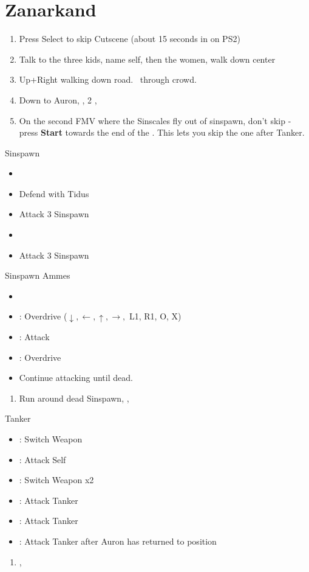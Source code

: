 \chapter{Zanarkand}

\begin{enumerate}
	\item Press Select to skip Cutscene (about 15 seconds in on PS2)
	\item Talk to the three kids, name self, then the women, walk down center
	\item Up+Right walking down road. \sd \ through crowd. \skippablefmv[2:30]
	\item Down to Auron, \sd, 2 \skippablefmv[2:30], \sd
	\item On the second FMV where the Sinscales fly out of sinspawn, don't skip - press \textbf{Start} towards the end of the \fmv. This lets you skip the one after Tanker.
\end{enumerate}
\begin{battle}{Sinspawn}
	\begin{itemize}
		\item \sd
		\item Defend with Tidus
		\item Attack 3 Sinspawn
		\item \sd
		\item Attack 3 Sinspawn
	\end{itemize}
\end{battle}
\begin{battle}[2400]{Sinspawn Ammes}
	\begin{itemize}
		\item \sd
		\item \auron: Overdrive ($\downarrow, \leftarrow, \uparrow, \rightarrow,$ L1, R1, O, X)
		\item \tidus: Attack
		\item \tidus: Overdrive
		\item Continue attacking until dead.
	\end{itemize}
\end{battle}
\begin{enumerate}[resume]
	\item Run around dead Sinspawn, \save, \sd
\end{enumerate}
\begin{battle}[1000]{Tanker}
	\begin{itemize}
		\item \tidus: Switch Weapon
		\item \auron: Attack Self
		\item \tidus: Switch Weapon x2
		\item \tidus: Attack Tanker
		\item \auron: Attack Tanker
		\item \tidus: Attack Tanker after Auron has returned to position
	\end{itemize}
\end{battle}
\begin{enumerate}[resume]
	\item \cs[2:00], \skippablefmv
\end{enumerate}